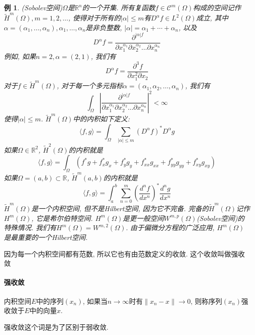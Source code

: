 \documentclass[a4paper,11pt]{article}
\theoremstyle{mystyle}
\newtheorem{example}{\hspace{2em}例}[section]
\begin{document}
\begin{example}
  (Sobolev空间)$\Omega$是$\mathbb{R}^n$的一个开集. 所有复函数$f\in\mathcal{C}^m(\Omega)$构成的空间记作$\tilde{H}^m(\Omega),m=1,2,\dots$, 使得对于所有的$|\alpha|\leq m$有$D^\alpha f\in L^2(\Omega)$成立, 其中$\alpha=(\alpha_1,\dots,\alpha_n), \alpha_1,\dots,\alpha_n$是非负整数, $|\alpha|=\alpha_1+\cdots+\alpha_n$, 以及
  \begin{equation*}
    D^\alpha f=\frac{\partial^{|\alpha|f}}{\partial x_1^{\alpha_1}\partial x_2^{\alpha_2}\dots\partial x_n^{\alpha_n}}
  \end{equation*}
  例如, 如果$n=2,\alpha=(2,1)$, 我们有
  \begin{equation*}
    D^\alpha f=\frac{\partial^3 f}{\partial x_1^2\partial x_2}
  \end{equation*}
  对于$f\in\tilde{H}^m(\Omega)$, 对于每一个多元指标$\alpha=(\alpha_1,\alpha_2,\dots,\alpha_n)$, 我们有
  \begin{equation*}
    \int_{\Omega}|\frac{\partial^{|\alpha| f}}{\partial x_1^{\alpha_1}\partial x_2^{\alpha_2}\dots\partial x_n^{\alpha_n}}|^2<\infty
  \end{equation*}
  使得$|\alpha|\leq m$. $\tilde{H}^m(\Omega)$中的内积如下定义:
  \begin{equation*}
    \langle f,g\rangle=\int_{\Omega}\sum_{|\alpha|\leq m}(D^\alpha f)^*D^\alpha g
  \end{equation*}
  如果$\Omega\in \mathbb{R}^2$, $\tilde{H}^2(\Omega)$的内积就是
  \begin{equation*}
    \langle f,g\rangle=\int_{\Omega}(f^*g+f_x^*g_x+f_y^*g_y+f_{xx}^*g_{xx}+f_{yy}^*g_{yy}+f_{xy}^*g_{xy})
  \end{equation*}
  如果$\Omega=(a,b)\subset \mathbb{R}$, $\tilde{H}^m(a,b)$的内积就是
  \begin{equation*}
    \langle f,g\rangle=\int_{a}^{b}\sum_{n=0}^{m}(\frac{d^n f}{dx^n})^* \frac{d^n g}{dx^n}
  \end{equation*}
  $\tilde{H}^m(\Omega)$是一个内积空间, 但不是Hilbert空间, 因为它不完备. 完备的$\tilde{H}^m(\Omega)$记作$H^m(\Omega)$, 它是希尔伯特空间. $H^m(\Omega)$是更一般空间$W^{m,p}(\Omega)$(Sobolev空间)的特殊情况. 我们有$H^m(\Omega)=W^{m,2}(\Omega)$. 由于偏微分方程的广泛应用, $H^m(\Omega)$是最重要的一个Hilbert空间.
\end{example}
因为每一个内积空间都有范数, 所以它也有由范数定义的收敛. 这个收敛叫做强收敛
\paragraph*{强收敛}
\begin{definition}
  内积空间$E$中的序列$(x_n)$, 如果当$n\to\infty$时有$\|x_n-x\|\to 0$, 则称序列$(x_n)$强收敛于$E$中的向量$x$.
\end{definition}
强收敛这个词是为了区别于弱收敛.
\end{document}
